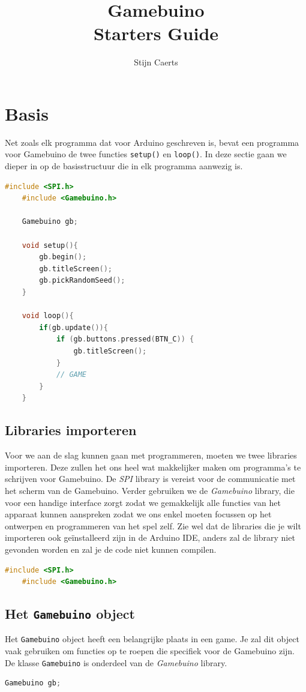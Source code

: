 \documentclass[a4paper,titlepage,12pt]{article}
\title{Gamebuino\\ \small{Starters Guide}}
\author{Stijn Caerts}
\begin{document}
	\maketitle
	\tableofcontents
	\newpage
	
	\section{Basis}
	Net zoals elk programma dat voor Arduino geschreven is, bevat een programma voor Gamebuino de twee functies \texttt{setup()} en \texttt{loop()}. In deze sectie gaan we dieper in op de basisstructuur die in elk programma aanwezig is.
	
	\begin{lstlisting}[language=C++, caption=Structuur van een Gamebuino programma]
	#include <SPI.h>
	#include <Gamebuino.h>
	
	Gamebuino gb;
	
	void setup(){
		gb.begin();
		gb.titleScreen();
		gb.pickRandomSeed();
	}
	
	void loop(){
		if(gb.update()){
			if (gb.buttons.pressed(BTN_C)) {
				gb.titleScreen();
			}
			// GAME
		}
	}
	\end{lstlisting}
	
	
	\subsection{Libraries importeren}
	Voor we aan de slag kunnen gaan met programmeren, moeten we twee libraries importeren. Deze zullen het ons heel wat makkelijker maken om programma's te schrijven voor Gamebuino. De \emph{SPI} library is vereist voor de communicatie met het scherm van de Gamebuino. Verder gebruiken we de \emph{Gamebuino} library, die voor een handige interface zorgt zodat we gemakkelijk alle functies van het apparaat kunnen aanspreken zodat we ons enkel moeten focussen op het ontwerpen en programmeren van het spel zelf.
	Zie wel dat de libraries die je wilt importeren ook geïnstalleerd zijn in de Arduino IDE, anders zal de library niet gevonden worden en zal je de code niet kunnen compilen.
	\begin{lstlisting}[language=C++, caption={Importeren van libraries}]
	#include <SPI.h>
	#include <Gamebuino.h>
	\end{lstlisting}
	
	
	\subsection{Het \texttt{Gamebuino} object}
	Het \texttt{Gamebuino} object heeft een belangrijke plaats in een game. Je zal dit object vaak gebruiken om functies op te roepen die specifiek voor de Gamebuino zijn. De klasse \texttt{Gamebuino} is onderdeel van de \emph{Gamebuino} library.
	\begin{lstlisting}[language=C++, caption={Aanmaken van een \texttt{Gamebuino} object}]
	Gamebuino gb;
	\end{lstlisting}
	
\end{document}
